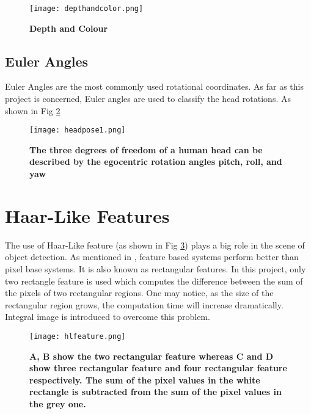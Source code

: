 \begin{figure}
	\centering
	\texttt{[image: depthandcolor.png]}
	\caption[depth and colour images]{\label{fig:depth}}  \textbf{Depth and Colour} 
\end{figure}

\subsection{Euler Angles}
\label{sec:eulerangles}
Euler Angles are the most commonly used rotational coordinates. As far as this project is concerned, Euler angles are used to classify the head rotations. As shown in Fig \ref{fig:eulerangles}

\begin{figure}
	\centering
	\texttt{[image: headpose1.png]}
	\caption[Euler Angles]{\label{fig:eulerangles}}  \textbf{The three degrees of freedom of a human head can be described by the egocentric rotation angles pitch, roll, and yaw \cite{HPS}} 
\end{figure}





\section{Haar-Like Features}
\label{sec:HLfeatures}
The use of Haar-Like feature (as shown in Fig \ref{fig:hlfeature}) plays a big role in the scene of object detection. As mentioned in \cite{facedetect}, feature based systems perform better than pixel base systems. It is also known as rectangular features. In this project, only two rectangle feature is used which computes the difference between the sum of the pixels of two rectangular regions. One may notice, as the size of the rectangular region grows, the computation time will increase dramatically. Integral image is introduced to overcome this problem. \cite{facedetect}

\begin{figure}
	\centering
	\texttt{[image: hlfeature.png]}
	\caption[Haar like Feature]{\label{fig:hlfeature}}  \textbf{A, B show the two rectangular feature whereas C and D show three rectangular feature and four rectangular feature respectively. The sum of the pixel values in the white rectangle is subtracted from the sum of the pixel values in the grey one. } \cite{facedetect}
\end{figure}

